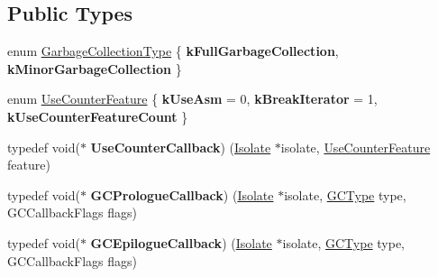 \subsection*{Public Types}
\begin{DoxyCompactItemize}
\item 
enum \hyperlink{classv8_1_1Isolate_a5ae00cc99d8aca148c6f5f9698c432c9}{Garbage\+Collection\+Type} \{ {\bfseries k\+Full\+Garbage\+Collection}, 
{\bfseries k\+Minor\+Garbage\+Collection}
 \}
\item 
enum \hyperlink{classv8_1_1Isolate_aed6909379c3f2820cb3084710b73385d}{Use\+Counter\+Feature} \{ {\bfseries k\+Use\+Asm} = 0, 
{\bfseries k\+Break\+Iterator} = 1, 
{\bfseries k\+Use\+Counter\+Feature\+Count}
 \}
\item 
\hypertarget{classv8_1_1Isolate_a7537ead98ee88eec2976348ba992935c}{}typedef void($\ast$ {\bfseries Use\+Counter\+Callback}) (\hyperlink{classv8_1_1Isolate}{Isolate} $\ast$isolate, \hyperlink{classv8_1_1Isolate_aed6909379c3f2820cb3084710b73385d}{Use\+Counter\+Feature} feature)\label{classv8_1_1Isolate_a7537ead98ee88eec2976348ba992935c}

\item 
\hypertarget{classv8_1_1Isolate_ab14f02c51e012f839e6cc184ede4814a}{}typedef void($\ast$ {\bfseries G\+C\+Prologue\+Callback}) (\hyperlink{classv8_1_1Isolate}{Isolate} $\ast$isolate, \hyperlink{namespacev8_ac109d6f27e0c0f9ef4e98bcf7a806cf2}{G\+C\+Type} type, G\+C\+Callback\+Flags flags)\label{classv8_1_1Isolate_ab14f02c51e012f839e6cc184ede4814a}

\item 
\hypertarget{classv8_1_1Isolate_a3e7351067af07d2a56c57d855fada4bb}{}typedef void($\ast$ {\bfseries G\+C\+Epilogue\+Callback}) (\hyperlink{classv8_1_1Isolate}{Isolate} $\ast$isolate, \hyperlink{namespacev8_ac109d6f27e0c0f9ef4e98bcf7a806cf2}{G\+C\+Type} type, G\+C\+Callback\+Flags flags)\label{classv8_1_1Isolate_a3e7351067af07d2a56c57d855fada4bb}

\end{DoxyCompactItemize}
